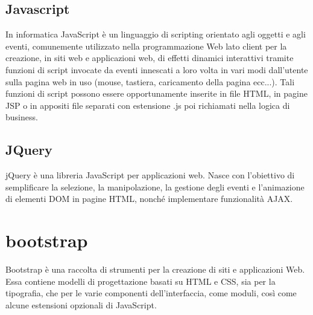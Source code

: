 \subsection{Javascript}
In informatica JavaScript è un linguaggio di scripting orientato agli oggetti e agli eventi, comunemente utilizzato nella programmazione Web lato client per la creazione, in siti web e applicazioni web, di effetti dinamici interattivi tramite funzioni di script invocate da eventi innescati a loro volta in vari modi dall'utente sulla pagina web in uso (mouse, tastiera, caricamento della pagina ecc...). Tali funzioni di script possono essere opportunamente inserite in file HTML, in pagine JSP o in appositi file separati con estensione .js poi richiamati nella logica di business.

\subsection{JQuery}
jQuery è una libreria JavaScript per applicazioni web. Nasce con l'obiettivo di semplificare la selezione, la manipolazione, la gestione degli eventi e l'animazione di elementi DOM in pagine HTML, nonché implementare funzionalità AJAX.

\section{bootstrap}
Bootstrap è una raccolta di strumenti per la creazione di siti e applicazioni Web. Essa contiene modelli di progettazione basati su HTML e CSS, sia per la tipografia, che per le varie componenti dell’interfaccia, come moduli, così come alcune estensioni opzionali di
JavaScript.